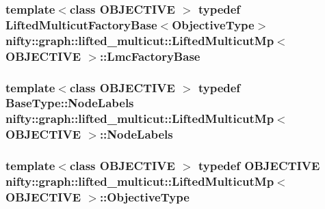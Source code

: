 \subsubsection[{Lmc\+Factory\+Base}]{\setlength{\rightskip}{0pt plus 5cm}template$<$class O\+B\+J\+E\+C\+T\+I\+V\+E $>$ typedef {\bf Lifted\+Multicut\+Factory\+Base}$<${\bf Objective\+Type}$>$ {\bf nifty\+::graph\+::lifted\+\_\+multicut\+::\+Lifted\+Multicut\+Mp}$<$ O\+B\+J\+E\+C\+T\+I\+V\+E $>$\+::{\bf Lmc\+Factory\+Base}}\label{classnifty_1_1graph_1_1lifted__multicut_1_1LiftedMulticutMp_af71b591afe9d847b241acab738c740c4}
\hypertarget{classnifty_1_1graph_1_1lifted__multicut_1_1LiftedMulticutMp_af6da41df53a36b0b01a57035eed36121}{}
\subsubsection[{Node\+Labels}]{\setlength{\rightskip}{0pt plus 5cm}template$<$class O\+B\+J\+E\+C\+T\+I\+V\+E $>$ typedef Base\+Type\+::\+Node\+Labels {\bf nifty\+::graph\+::lifted\+\_\+multicut\+::\+Lifted\+Multicut\+Mp}$<$ O\+B\+J\+E\+C\+T\+I\+V\+E $>$\+::{\bf Node\+Labels}}\label{classnifty_1_1graph_1_1lifted__multicut_1_1LiftedMulticutMp_af6da41df53a36b0b01a57035eed36121}
\hypertarget{classnifty_1_1graph_1_1lifted__multicut_1_1LiftedMulticutMp_acce0234d990c40af0002f39dd7e309b7}{}
\subsubsection[{Objective\+Type}]{\setlength{\rightskip}{0pt plus 5cm}template$<$class O\+B\+J\+E\+C\+T\+I\+V\+E $>$ typedef O\+B\+J\+E\+C\+T\+I\+V\+E {\bf nifty\+::graph\+::lifted\+\_\+multicut\+::\+Lifted\+Multicut\+Mp}$<$ O\+B\+J\+E\+C\+T\+I\+V\+E $>$\+::{\bf Objective\+Type}}\label{classnifty_1_1graph_1_1lifted__multicut_1_1LiftedMulticutMp_acce0234d990c40af0002f39dd7e309b7}
\hypertarget{classnifty_1_1graph_1_1lifted__multicut_1_1LiftedMulticutMp_af9810af21796143a4ae499e061e5f80c}{}
